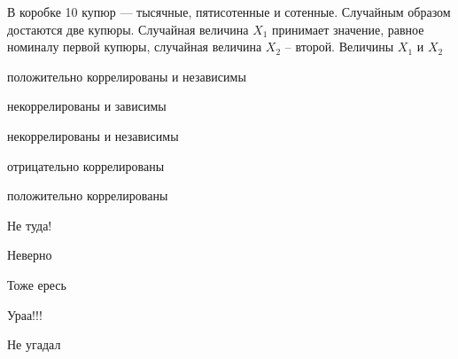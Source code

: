 
\begin{question}
В коробке 10 купюр --- тысячные, пятисотенные и сотенные. Случайным
образом достаются две купюры. Случайная величина \(X_1\) принимает
значение, равное номиналу первой купюры, случайная величина \(X_2\) --
второй. Величины \(X_1\) и \(X_2\)
\begin{answerlist}
  \item положительно коррелированы и независимы
  \item некоррелированы и зависимы
  \item некоррелированы и независимы
  \item отрицательно коррелированы
  \item положительно коррелированы
\end{answerlist}
\end{question}

\begin{solution}
\begin{answerlist}
  \item Не туда!
  \item Неверно
  \item Тоже ересь
  \item Ураа!!!
  \item Не угадал
\end{answerlist}
\end{solution}

